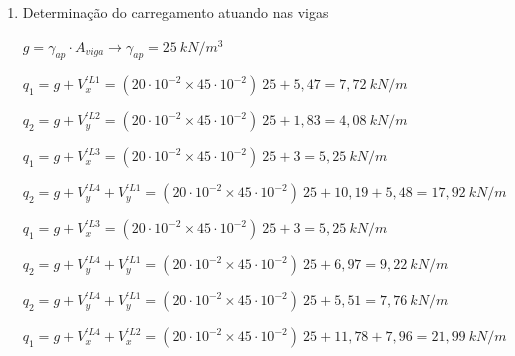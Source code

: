 
\begin{resposta}
    \begin{enumerate}[start=5]
        \item Determinação do carregamento atuando nas vigas

        


        

        $g= \gamma_{ap}\cdot A_{viga} \to \gamma_{ap}=25 \ kN/m^3$ \cite[tabela 1]{nbr6120} \newline

        $q_1=g+V_{x}^{'L1}=(20 \cdot 10^{-2}\times 45 \cdot 10^{-2})\ 25 +5,47 = 7,72 \ kN/m$

        $q_2=g+V_{y}^{'L2}=(20 \cdot 10^{-2}\times 45 \cdot 10^{-2})\ 25 +1,83 = 4,08 \ kN/m$ \newline

        

        \newpage

        \paracasa


        

        $q_1=g+V_{x}^{'L3}=(20 \cdot 10^{-2}\times 45 \cdot 10^{-2})\ 25 +3 = 5,25 \ kN/m$

        $q_2=g+V_{y}^{'L4}+V_{y}^{'L1}=(20 \cdot 10^{-2}\times 45 \cdot 10^{-2})\ 25 +10,19+5,48 = 17,92 \ kN/m$ \newline


        

        $q_1=g+V_{x}^{'L3}=(20 \cdot 10^{-2}\times 45 \cdot 10^{-2})\ 25 +3 = 5,25 \ kN/m$

        $q_2=g+V_{y}^{'L4}+V_{y}^{'L1}=(20 \cdot 10^{-2}\times 45 \cdot 10^{-2})\ 25 +6,97=9,22 \ kN/m$

        $q_2=g+V_{y}^{'L4}+V_{y}^{'L1}=(20 \cdot 10^{-2}\times 45 \cdot 10^{-2})\ 25 +5,51 = 7,76 \ kN/m$ \newline


        

        $q_1=g+V_{x}^{'L4}+V_{x}^{'L2}=(20 \cdot 10^{-2}\times 45 \cdot 10^{-2})\ 25 +11,78+7,96 = 21,99 \ kN/m$


\end{enumerate}
\end{resposta}
